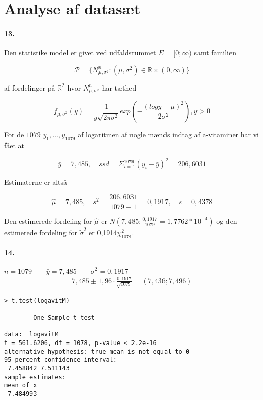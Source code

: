 \section{Analyse af datasæt}

\paragraph{13.}
Den statistike model er givet ved udfaldsrummet $E=[0; \infty)$ samt
familien

\begin{equation*}
  \mathcal{P} =\{ N^n_{\mu,\sigma^2} : (\mu, \sigma^2) \in \mathbb{R}
  \times (0, \infty) \}
\end{equation*}

af fordelinger på $\mathbb{R}^2$ hvor $N^n_{\mu, \sigma^2}$ har tæthed

\begin{equation*}
  f_{\mu, \sigma^2}(y) = \frac{1}{y \sqrt{2\pi\sigma^2}} exp ( -
  \frac{(log y - \mu)^2}{2\sigma^2} ), y>0
\end{equation*}

For de $1079$ $y_1, \ldots, y_{1079}$ af logaritmen af nogle mænds
indtag af a-vitaminer har vi fået at

\begin{equation*}
  \bar{y} = 7,485, \quad ssd = \Sigma^{1079}_{i=1}(y_i - \bar{y})^2 =
  206,6031
\end{equation*}

Estimaterne er altså

\begin{equation*}
  \hat{\mu} = 7,485, \quad s^2 = \frac{206,6031}{1079-1} = 0,1917, \quad
  s = 0,4378
\end{equation*}

Den estimerede fordeling for $\hat{\mu}$ er $N(7,485;
\frac{0,1917}{1079} = 1,7762 * 10^{-4})$ og den estimerede fordeling
for $\tilde{\sigma}^2$ er 0,1914$\chi^2_{1078}$.

\paragraph{14.} 
$n = 1079 \qquad \bar{y} = 7,485 \qquad \sigma^2 = 0,1917$
\begin{align*}
7,485 \pm 1,96 \cdot \frac{0,1917}{\sqrt{1079}} = (7,436 ; 7,496)
\end{align*}

\begin{verbatim}
> t.test(logavitM)

        One Sample t-test

data:  logavitM 
t = 561.6206, df = 1078, p-value < 2.2e-16
alternative hypothesis: true mean is not equal to 0 
95 percent confidence interval:
 7.458842 7.511143 
sample estimates:
mean of x 
 7.484993 
\end{verbatim}


